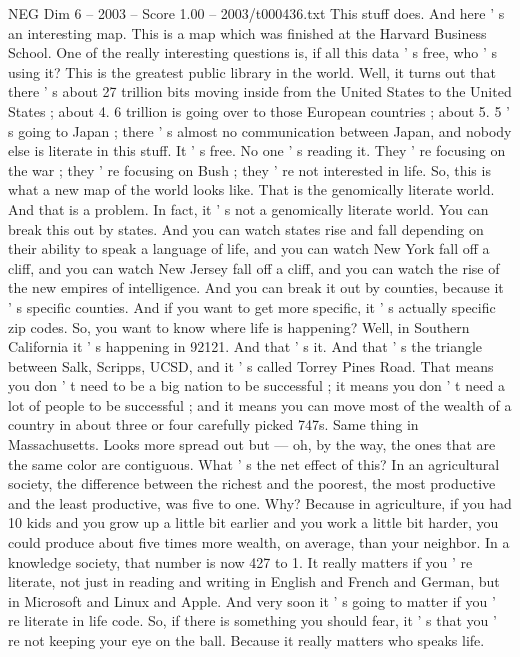 \begin{textsample}{NEG Dim 6 – 2003 – Score 1.00 – 2003/t000436.txt}
This stuff does.
And here ' s an interesting map.
This is a map which was finished at the Harvard Business School.
One of the really interesting questions is, if all this data ' s free, who ' s using it?
This is the greatest public library in the world.
Well, it turns out that there ' s about 27 trillion bits moving inside from the United States to the United States ; about 4. 6 trillion is going over to those European countries ; about 5. 5 ' s going to Japan ; there ' s almost no communication between Japan, and nobody else is literate in this stuff.
It ' s free.
No one ' s reading it.
They ' re focusing on the war ; they ' re focusing on Bush ; they ' re not interested in life.
So, this is what a new map of the world looks like.
That is the genomically literate world.
And that is a problem.
In fact, it ' s not a genomically literate world.
You can break this out by states.
And you can watch states rise and fall depending on their ability to speak a language of life, and you can watch New York fall off a cliff, and you can watch New Jersey fall off a cliff, and you can watch the rise of the new empires of intelligence.
And you can break it out by counties, because it ' s specific counties.
And if you want to get more specific, it ' s actually specific zip codes.
So, you want to know where life is happening?
Well, in Southern California it ' s happening in 92121.
And that ' s it.
And that ' s the triangle between Salk, Scripps, UCSD, and it ' s called Torrey Pines Road.
That means you don ' t need to be a big nation to be successful ; it means you don ' t need a lot of people to be successful ; and it means you can move most of the wealth of a country in about three or four carefully picked 747s.
Same thing in Massachusetts.
Looks more spread out but — oh, by the way, the ones that are the same color are contiguous.
What ' s the net effect of this?
In an agricultural society, the difference between the richest and the poorest, the most productive and the least productive, was five to one.
Why?
Because in agriculture, if you had 10 kids and you grow up a little bit earlier and you work a little bit harder, you could produce about five times more wealth, on average, than your neighbor.
In a knowledge society, that number is now 427 to 1.
It really matters if you ' re literate, not just in reading and writing in English and French and German, but in Microsoft and Linux and Apple.
And very soon it ' s going to matter if you ' re literate in life code.
So, if there is something you should fear, it ' s that you ' re not keeping your eye on the ball.
Because it really matters who speaks life.

\end{textsample}
